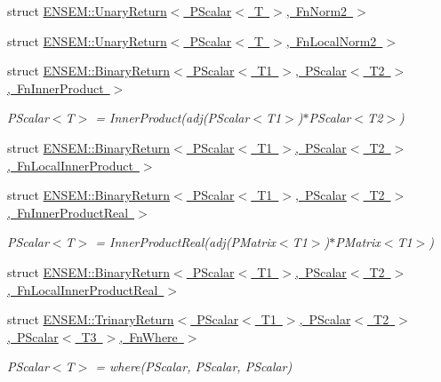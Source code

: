 \begin{DoxyCompactItemize}
\item 
struct \mbox{\hyperlink{structENSEM_1_1UnaryReturn_3_01PScalar_3_01T_01_4_00_01FnNorm2_01_4}{E\+N\+S\+E\+M\+::\+Unary\+Return$<$ P\+Scalar$<$ T $>$, Fn\+Norm2 $>$}}
\item 
struct \mbox{\hyperlink{structENSEM_1_1UnaryReturn_3_01PScalar_3_01T_01_4_00_01FnLocalNorm2_01_4}{E\+N\+S\+E\+M\+::\+Unary\+Return$<$ P\+Scalar$<$ T $>$, Fn\+Local\+Norm2 $>$}}
\item 
struct \mbox{\hyperlink{structENSEM_1_1BinaryReturn_3_01PScalar_3_01T1_01_4_00_01PScalar_3_01T2_01_4_00_01FnInnerProduct_01_4}{E\+N\+S\+E\+M\+::\+Binary\+Return$<$ P\+Scalar$<$ T1 $>$, P\+Scalar$<$ T2 $>$, Fn\+Inner\+Product $>$}}
\begin{DoxyCompactList}\small\item\em P\+Scalar$<$\+T$>$ = Inner\+Product(adj(\+P\+Scalar$<$\+T1$>$)$\ast$\+P\+Scalar$<$\+T2$>$) \end{DoxyCompactList}\item 
struct \mbox{\hyperlink{structENSEM_1_1BinaryReturn_3_01PScalar_3_01T1_01_4_00_01PScalar_3_01T2_01_4_00_01FnLocalInnerProduct_01_4}{E\+N\+S\+E\+M\+::\+Binary\+Return$<$ P\+Scalar$<$ T1 $>$, P\+Scalar$<$ T2 $>$, Fn\+Local\+Inner\+Product $>$}}
\item 
struct \mbox{\hyperlink{structENSEM_1_1BinaryReturn_3_01PScalar_3_01T1_01_4_00_01PScalar_3_01T2_01_4_00_01FnInnerProductReal_01_4}{E\+N\+S\+E\+M\+::\+Binary\+Return$<$ P\+Scalar$<$ T1 $>$, P\+Scalar$<$ T2 $>$, Fn\+Inner\+Product\+Real $>$}}
\begin{DoxyCompactList}\small\item\em P\+Scalar$<$\+T$>$ = Inner\+Product\+Real(adj(\+P\+Matrix$<$\+T1$>$)$\ast$\+P\+Matrix$<$\+T1$>$) \end{DoxyCompactList}\item 
struct \mbox{\hyperlink{structENSEM_1_1BinaryReturn_3_01PScalar_3_01T1_01_4_00_01PScalar_3_01T2_01_4_00_01FnLocalInnerProductReal_01_4}{E\+N\+S\+E\+M\+::\+Binary\+Return$<$ P\+Scalar$<$ T1 $>$, P\+Scalar$<$ T2 $>$, Fn\+Local\+Inner\+Product\+Real $>$}}
\item 
struct \mbox{\hyperlink{structENSEM_1_1TrinaryReturn_3_01PScalar_3_01T1_01_4_00_01PScalar_3_01T2_01_4_00_01PScalar_3_01T3_01_4_00_01FnWhere_01_4}{E\+N\+S\+E\+M\+::\+Trinary\+Return$<$ P\+Scalar$<$ T1 $>$, P\+Scalar$<$ T2 $>$, P\+Scalar$<$ T3 $>$, Fn\+Where $>$}}
\begin{DoxyCompactList}\small\item\em P\+Scalar$<$\+T$>$ = where(\+P\+Scalar, P\+Scalar, P\+Scalar) \end{DoxyCompactList}\end{DoxyCompactItemize}
